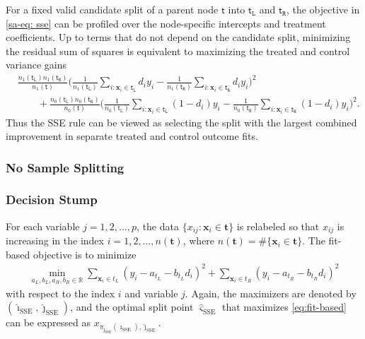 \documentclass[10pt]{article}
\def\nodet{\mathsf{t}}
\def\bt{\mathbf{t}}
\def\bx{\mathbf{x}}
\def\ttL{\mathtt{L}}
\def\ttR{\mathtt{R}}
\def\reals{\mathbb{R}}
\theoremstyle{definition}
\theoremstyle{remark}
\begin{document}
For a fixed valid candidate split of a parent node $\nodet$ into $\nodet_{\mathtt{L}}$ and $\nodet_{\mathtt{R}}$, the objective in \eqref{sa-eq: sse} can be profiled over the node-specific intercepts and treatment coefficients. Up to terms that do not depend on the candidate split, minimizing the residual sum of squares is equivalent to maximizing the treated and control variance gains
\begin{align*}
    &\frac{n_1(\nodet_{\mathtt{L}})n_1(\nodet_{\mathtt{R}})}{n_1(\nodet)}
            \Big( \frac{1}{n_1(\nodet_{\mathtt{L}})} \sum_{i: \bx_i \in \nodet_{\ttL}} d_i y_i
                - \frac{1}{n_1(\nodet_{\mathtt{R}})} \sum_{i: \bx_i \in \nodet_{\ttR}} d_i y_i \Big)^2 \\
    & \qquad +
    \frac{n_0(\nodet_{\mathtt{L}})n_0(\nodet_{\mathtt{R}})}{n_0(\nodet)}
            \Big( \frac{1}{n_0(\nodet_{\mathtt{L}})} \sum_{i: \bx_i \in \nodet_{\ttL}} (1 - d_i) y_i
                - \frac{1}{n_0(\nodet_{\mathtt{R}})} \sum_{i: \bx_i \in \nodet_{\ttR}} (1 - d_i) y_i \Big)^2.
\end{align*}
Thus the SSE rule can be viewed as selecting the split with the largest combined improvement in separate treated and control outcome fits.

\subsubsection{No Sample Splitting}

\subsubsection*{Decision Stump}

For each variable $ j = 1, 2, \dots, p $, the data $ \{ x_{ij}: \bx_i \in \bt \} $ is relabeled so that $ x_{ij} $ is increasing in the index $ i = 1, 2, \dots, n(\bt) $, where $ n(\bt) = \#\{ \bx_i \in \bt \} $. The fit-based objective is to minimize
\begin{align}\label{eq:fit-based}
    \min_{a_L, b_L, a_R, b_R \in \reals} \sum_{\bx_i \in t_L} (y_i - a_{t_L} - b_{t_L} d_i)^2 + \sum_{\bx_i \in t_R} (y_i - a_{t_R} - b_{t_R} d_i)^2
\end{align}
with respect to the index $ i $ and variable $ j $. Again, the maximizers are denoted by $ (\hat{\imath}_\text{SSE}, \hat{\jmath}_\text{SSE}) $, and the optimal split point $ \hat \varsigma_\text{SSE} $ that maximizes \eqref{eq:fit-based} can be expressed as $ x_{\pi_{\hat{\jmath}_\text{SSE}}(\hat{\imath}_\text{SSE}), \hat{\jmath}_\text{SSE}}$.
\end{document}
